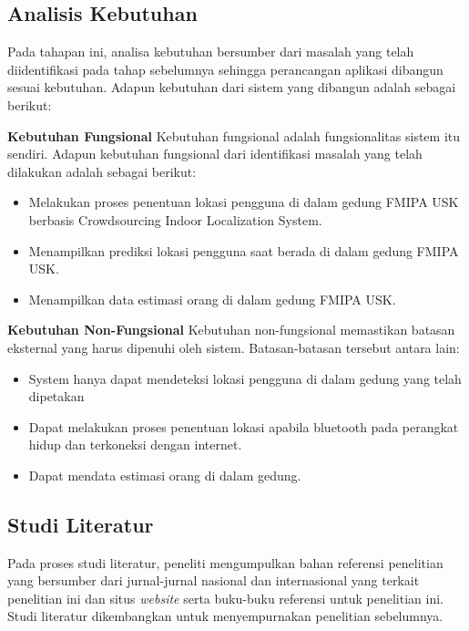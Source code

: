 \subsection{Analisis Kebutuhan}
Pada tahapan ini, analisa kebutuhan bersumber dari masalah yang telah diidentifikasi pada tahap sebelumnya sehingga perancangan aplikasi dibangun sesuai kebutuhan. Adapun kebutuhan dari sistem yang dibangun adalah sebagai berikut:

\par \textbf{Kebutuhan Fungsional} Kebutuhan fungsional adalah fungsionalitas sistem itu sendiri. Adapun kebutuhan fungsional dari identifikasi masalah yang telah dilakukan adalah sebagai berikut:

\begin{itemize}
	\item Melakukan proses penentuan lokasi pengguna di dalam gedung FMIPA USK berbasis Crowdsourcing Indoor Localization System.

	\item Menampilkan prediksi lokasi pengguna saat berada di dalam gedung FMIPA USK.

	\item Menampilkan data estimasi orang di dalam gedung FMIPA USK.

\end{itemize}

\par \textbf{Kebutuhan Non-Fungsional} Kebutuhan non-fungsional memastikan batasan eksternal yang harus dipenuhi oleh sistem. Batasan-batasan tersebut antara lain:
\begin{itemize}
	\item System hanya dapat mendeteksi lokasi pengguna di dalam gedung yang telah dipetakan

	\item Dapat melakukan proses penentuan lokasi apabila bluetooth pada perangkat hidup dan terkoneksi dengan internet.

	\item Dapat mendata estimasi orang di dalam gedung.

\end{itemize}



\subsection{Studi Literatur}
Pada proses studi literatur, peneliti mengumpulkan bahan referensi penelitian yang bersumber dari jurnal-jurnal nasional dan internasional yang terkait penelitian ini dan situs \textit{website} serta buku-buku referensi untuk penelitian ini. Studi literatur dikembangkan untuk menyempurnakan penelitian sebelumnya.

